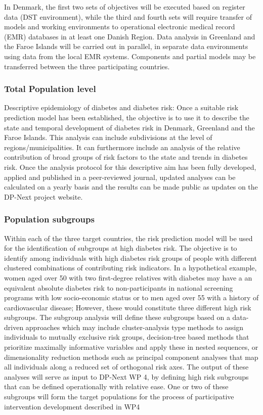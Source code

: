 \documentclass[11pt]{article}
\begin{document}
In Denmark, the first two sets of objectives will be executed based on register data (DST environment),
while the third and fourth sets will require transfer of models and working environments to operational
electronic medical record (EMR) databases in at least one Danish Region. Data analysis in Greenland and
the Faroe Islands will be carried out in parallel, in separate data environments using data from the
local EMR systems. Components and partial models may be transferred between the three participating
countries.

\subsubsection{Total Population level}
\label{sec:org4f59f18}
Descriptive epidemiology of diabetes and diabetes risk: Once a suitable risk prediction model has been
established, the objective is to use it to describe the state and temporal development of diabetes risk
in Denmark, Greenland and the Faroe Islands. This analysis can include subdivisions at the level of
regions/municipalities. It can furthermore include an analysis of the relative contribution of broad
groups of risk factors to the state and trends in diabetes risk. Once the analysis protocol for this
descriptive aim has been fully developed, applied and published in a peer-reviewed journal, updated
analyses can be calculated on a yearly basis and the results can be made public as updates on the
DP-Next project website.

\subsubsection{Population subgroups}
\label{sec:org33f4935}
Within each of the three target countries, the risk prediction model will be used for the
identification of subgroups at high diabetes risk. The objective is to identify among individuals
with high diabetes risk groups of people with different clustered combinations of contributing risk
indicators. In a hypothetical example, women aged over 50 with two first-degree relatives with diabetes
may have a an equivalent absolute diabetes risk to non-participants in national screening programs with
low socio-economic status or to men aged over 55 with a history of cardiovascular disease; However,
these would constitute three different high risk subgroups. The subgroup analysis will define these
subgroups based on a data-driven approaches which may include cluster-analysis type methods to assign
individuals to mutually exclusive risk groups, decision-tree based methods that prioritize maximally
informative variables and apply these in nested sequences, or dimensionality reduction methods such as
principal component analyses that map all individuals along a reduced set of orthogonal risk axes.
The output of these analyses will serve as input to DP-Next WP 4, by defining high risk subgroups
that can be defined operationally with relative ease. One or two of these subgroups will form the
target populations for the process of participative intervention development described in WP4
\end{document}
